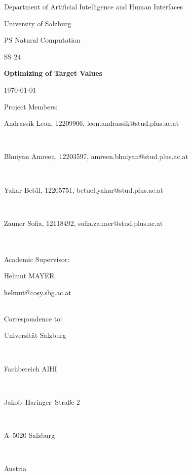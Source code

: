 \documentclass[12pt,fleqn,a4paper]{article}
\begin{document}
\begin{titlepage}%
\vspace{2cm}
\centerline{
\large{Department of Artificial Intelligence and Human Interfaces}}
\vspace{0.2cm}
\centerline{\large{University of Salzburg}}%
\vspace{1cm}

\centerline{\large{PS Natural Computation}}
\centerline{SS 24}
\vspace{1cm}

\centerline{\Large{\bf{Optimizing of Target Values}} }%
\vspace{1cm}

\vspace{0.4cm}%
\centerline{\today}
\vspace{5cm}%

\vspace{0.2cm}
Project Members:\\
\centerline{Andrassik Leon, 12209906, leon.andrassik@stud.plus.ac.at}\\
\centerline{Bhuiyan Amreen, 12203597, amreen.bhuiyan@stud.plus.ac.at}\\
\centerline{Yakar Bet\"ul, 12205751, betuel.yakar@stud.plus.ac.at}\\
\centerline{Zauner Sofia, 12118492, sofia.zauner@stud.plus.ac.at}\\
\vspace {1cm}\\

Academic Supervisor: \\
\centerline{Helmut MAYER}
\centerline{helmut@cosy.sbg.ac.at}
\vspace{1.5cm}\\
Correspondence to: \\
\centerline{Universit\"{a}t Salzburg} \\
\centerline{Fachbereich AIHI} \\
\centerline{Jakob--Haringer--Stra\ss e 2} \\
\centerline{A--5020 Salzburg} \\
\centerline{Austria}
\clearpage
\end{titlepage}


\clearpage
\pagestyle{headings}
\setcounter{page}{1}
\setcounter{page}{1}
\end{document}
